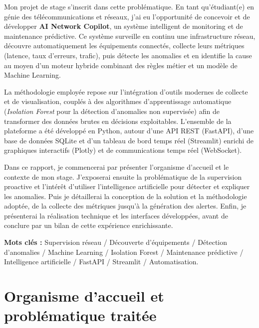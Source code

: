 \documentclass[12pt,a4paper]{report}
\begin{document}
Mon projet de stage s'inscrit dans cette problématique. En tant qu'étudiant(e) en
génie des télécommunications et réseaux, j'ai eu l'opportunité de concevoir et de
développer \textbf{AI Network Copilot}, un système intelligent de monitoring et de
maintenance prédictive. Ce système surveille en continu une infrastructure réseau,
découvre automatiquement les équipements connectés, collecte leurs métriques
(latence, taux d'erreurs, trafic), puis détecte les anomalies et en identifie la
cause au moyen d'un moteur hybride combinant des règles métier et un modèle de
Machine Learning.

La méthodologie employée repose sur l'intégration d'outils modernes de collecte et
de visualisation, couplés à des algorithmes d'apprentissage automatique
(\textit{Isolation Forest} pour la détection d'anomalies non supervisée) afin de
transformer des données brutes en décisions exploitables. L'ensemble de la
plateforme a été développé en Python, autour d'une API REST (FastAPI), d'une base
de données SQLite et d'un tableau de bord temps réel (Streamlit) enrichi de
graphiques interactifs (Plotly) et de communications temps réel (WebSocket).

Dans ce rapport, je commencerai par présenter l'organisme d'accueil et le contexte
de mon stage. J'exposerai ensuite la problématique de la supervision proactive et
l'intérêt d'utiliser l'intelligence artificielle pour détecter et expliquer les
anomalies. Puis je détaillerai la conception de la solution et la méthodologie
adoptée, de la collecte des métriques jusqu'à la génération des alertes. Enfin, je
présenterai la réalisation technique et les interfaces développées, avant de
conclure par un bilan de cette expérience enrichissante.

\vspace{0.5cm}
\noindent\textbf{Mots clés :} Supervision réseau / Découverte d'équipements /
Détection d'anomalies / Machine Learning / Isolation Forest / Maintenance prédictive /
Intelligence artificielle / FastAPI / Streamlit / Automatisation.

\setcounter{page}{1}

\chapter{Organisme d'accueil et problématique traitée}
\end{document}
